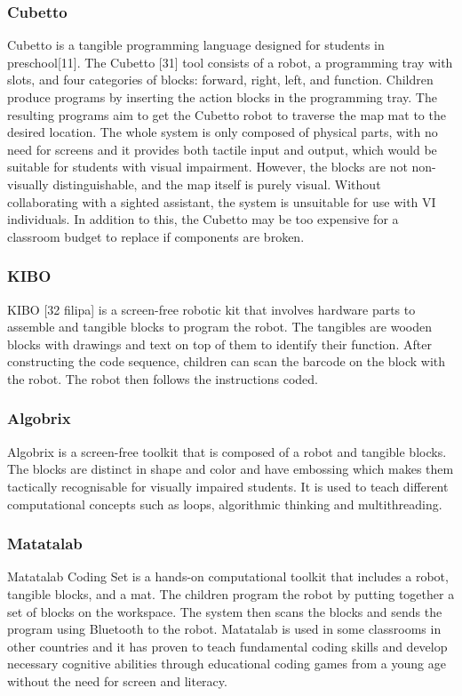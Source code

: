 \documentclass[oneside,%
                    author={Malak Hajji},
                    degree={BSc},
                    title={Designing An Accessible Computational Toolkit For Students},
                  subtitle={With Mixed Visual Abilities}]{dissertation}
\begin{document}
\subsubsection{Cubetto}
Cubetto is a tangible programming language designed for students in preschool[11]. The Cubetto [31] tool consists of a robot, a programming tray with slots, and four categories of blocks: forward, right, left, and function. Children produce programs by inserting the action blocks in the programming tray. The resulting programs aim to get the Cubetto robot to traverse the map mat to the desired location. The whole system is only composed of physical parts, with no need for screens and it provides both tactile input and output, which would be suitable for students with visual impairment. However, the blocks are not non-visually distinguishable, and the map itself is purely visual. Without collaborating with a sighted assistant, the system is unsuitable for use with VI individuals. In addition to this, the Cubetto may be too expensive for a classroom budget to replace if components are broken.  

\subsubsection{KIBO}
KIBO [32 filipa] is a screen-free robotic kit that involves hardware parts to assemble and tangible blocks to program the robot. The tangibles are wooden blocks with drawings and text on top of them to identify their function. After constructing the code sequence, children can scan the barcode on the block with the robot. The robot then follows the instructions coded.  

\subsubsection{Algobrix}
Algobrix is a screen-free toolkit that is composed of a robot and tangible blocks. The blocks are distinct in shape and color and have embossing which makes them tactically recognisable for visually impaired students. It is used to teach different computational concepts such as loops, algorithmic thinking and multithreading. 

\subsubsection{Matatalab}
Matatalab Coding Set is a hands-on computational toolkit that includes a robot, tangible blocks, and a mat. The children program the robot by putting together a set of blocks on the workspace. The system then scans the blocks and sends the program using Bluetooth to the robot. Matatalab is used in some classrooms in other countries and it has proven to teach fundamental coding skills and develop necessary cognitive abilities through educational coding games from a young age without the need for screen and literacy. 
\end{document}
